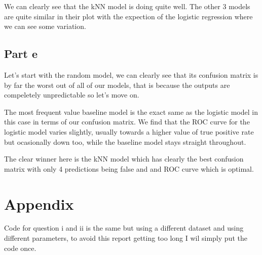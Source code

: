 \documentclass[10pt]{article}
\begin{document}
We can clearly see that the kNN model is doing quite well. The other 3 models are quite similar in their plot
with the expection of the logistic regression where we can see some variation.

\subsection*{Part e}
Let's start with the random model, we can clearly see that its confusion matrix is by far
the worst out of all of our models, that is because the outputs are compeletely unpredictable so let's move on.
\par
The most frequent value baseline model is the exact same as the logistic model in this case in terms
of our confusion matrix. We find that the ROC curve for the logistic model varies slightly, usually towards a higher value of
true positive rate but ocasionally down too, while the baseline model stays straight throughout.
\par
The clear winner here is the kNN model which has clearly the best confusion matrix with only 4 predictions being false and
and ROC curve which is optimal.

\section*{Appendix}
Code for question i and ii is the same but using a different dataset and using different parameters,
to avoid this report getting too long I wil simply put the code once.
\par
\end{document}
